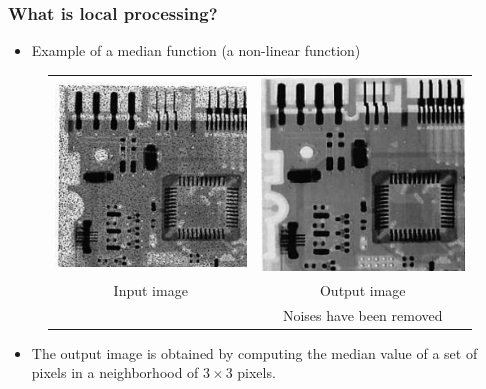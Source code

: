 \documentclass[english,11pt,table,handout]{beamer}
\begin{document}
\frame
{
	\frametitle{What is local processing?}
	\begin{itemize}
		\item Example of a median function (a non-linear function)
	\end{itemize}
	\centering
	\begin{figure}[!h]
		\begin{tabular}{cc}
			\includegraphics[scale=0.57]{image_salt_peper.png} &
			\includegraphics[scale=0.57]{image_salt_peper_denoise.png} \\
			Input image & Output image\\
				& Noises have been removed
		\end{tabular}
	\end{figure}
	
	\begin{itemize}
		\item The output image is obtained by computing the median value of a set of pixels in a neighborhood of $3 \times 3$ pixels.
	\end{itemize}
}
\end{document}
